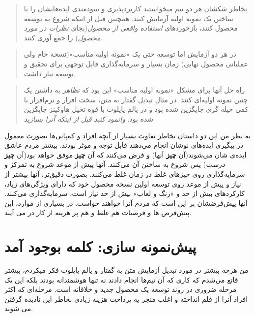 \begin{quote}
بخاطر شکشان هر دو تیم میخواستند کاربردپذیری و سودمندی ایده‌هایشان را با
ساختن یک نمونه اولیه آزمایش کنند. همچنین قبل از اینکه شروع به توسعه
محصول کنند، بازخوردهای \emph{استفاده واقعی از محصول}(بجای \emph{نظرات در
مورد محصول}) را جمع آوری کنند.
\end{quote}

\begin{quote}
در هر دو آزمایش اما توسعه حتی یک «نمونه اولیه مناسب»(نسخه خام ولی
عملیاتی محصول نهایی) زمان بسیار و سرمایه‌گذاری قابل توجهی برای تحقیق و
توسعه نیاز داشت.
\end{quote}

\begin{quote}
راه حل آنها برای مشکل «نمونه اولیه مناسب» این بود که \emph{تظاهر} به
داشتن یک چنین نمونه اولیه‌ای کنند. در مثال تبدیل گفتار به متن، سخت افزار
و نرم‌افزار با کمی حیله گری جایگزین شده بود و در پالم پایلوت با قوه تخیل
هاوکینز جایگزین شده بود. \emph{وانمود کنید قبل از اینکه آنرا بسازید}
\end{quote}

به نظر من این دو داستان بخاطر تفاوت بسیار از آنچه افراد و کمپانی‌ها
بصورت معمول در پیگیری ایده‌های نوشان انجام می‌دهند قابل توجه و موثر
بودند. بیشتر مردم عاشق ایده‌ی شان می‌شوند(آن \textbf{چیز} آنها) و فرض
می‌کنند که آن \textbf{چیز} موفق خواهد بود(آن \textbf{چیز} \emph{درست})
پس شروع به ساختن آن می‌کنند. آنها پیش از موعد شروع به تمرکز و
سرمایه‌گذاری روی چیزهای غلط در زمان غلط می‌کنند. بصورت دقیق‌تر، آنها
بیشتر از نیاز و پیش از موعد روی توسعه اولین نسخه محصول خود که دارای
ویژگی‌های زیاد، کارکردهای بیش از حد و «رنگ و لعاب» بیش از حد نیاز است،
سرمایه‌گذاری می‌کنند. آنها پیش‌فرضشان بر این است که مردم آنرا خواهند
خواست. در بسیاری از موارد، این پیش‌فرض ها و فرضیات هم غلط و هم پر هزینه
از کار در می آیند.

\section{پیش‌نمونه سازی: کلمه بوجود
آمد}\label{ux67eux6ccux634ux646ux645ux648ux646ux647-ux633ux627ux632ux6cc-ux6a9ux644ux645ux647-ux628ux648ux62cux648ux62f-ux622ux645ux62f}

من هرچه بیشتر در مورد تبدیل آزمایش متن به گفتار و پالم پایلوت فکر
میکردم، بیشتر قانع می‌شدم که کاری که آن تیم‌ها انجام دادند نه تنها
هوشمندانه بودند بلکه این یک مرحله ضروری در روند توسعه یک محصول جدید و
خلاقانه است. مرحله‌ای که اکثر افراد آنرا از قلم انداخته و اغلب منجر یه
پرداخت هزینه زیادی بخاطر این نادیده گرفتن می شوند.

